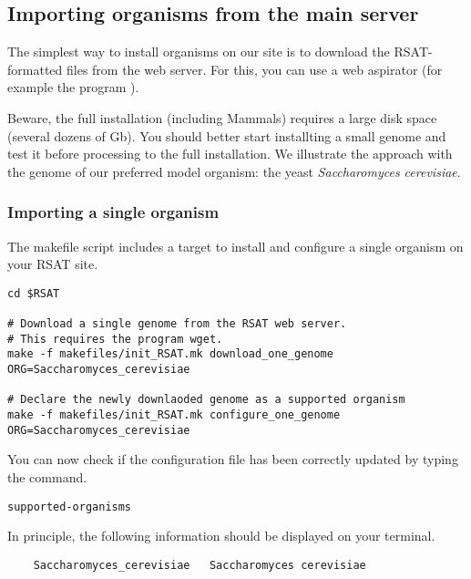 \subsection{Importing organisms from the \RSAT main server}

The simplest way to install organisms on our \RSAT site is to download
the RSAT-formatted files from the web server. For this, you can use a
web aspirator (for example the program ). 

Beware, the full installation (including Mammals) requires a large
disk space (several dozens of Gb). You should better start installting
a small genome and test it before processing to the full
installation. We illustrate the approach with the genome of our
preferred model organism: the yeast \textit{Saccharomyces cerevisiae}.

\subsubsection{Importing a single organism}

The makefile script  includes a target to
install and configure a single organism on your RSAT site. 

\begin{small}
\begin{verbatim}
cd $RSAT

# Download a single genome from the RSAT web server. 
# This requires the program wget.
make -f makefiles/init_RSAT.mk download_one_genome ORG=Saccharomyces_cerevisiae

# Declare the newly downlaoded genome as a supported organism
make -f makefiles/init_RSAT.mk configure_one_genome ORG=Saccharomyces_cerevisiae

\end{verbatim}
\end{small}

You can now check if the configuration file has been correctly updated
by typing the command.

\begin{verbatim}
supported-organisms
\end{verbatim}

In principle, the following information should be displayed on your
terminal.

\begin{small}
\begin{verbatim}
    Saccharomyces_cerevisiae   Saccharomyces cerevisiae
\end{verbatim}
\end{small}

